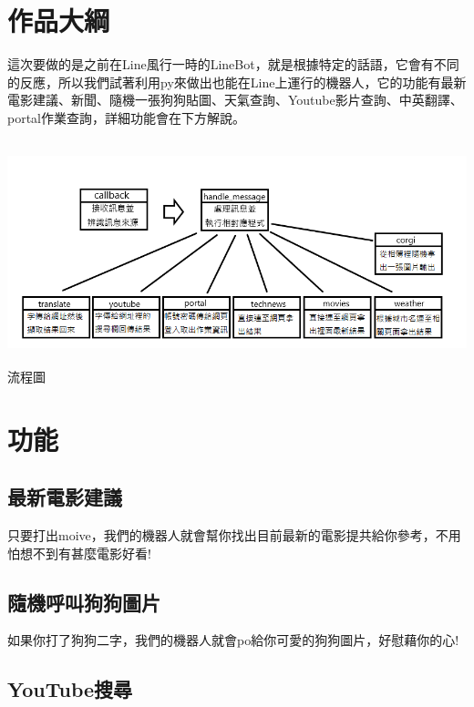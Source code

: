\documentclass{scrreprt}
\begin{document}
\begin{CJK}{UTF8}{bkai}
\chapter{作品大綱}

這次要做的是之前在Line風行一時的LineBot，就是根據特定的話語，它會有不同的反應，所以我們試著利用py來做出也能在Line上運行的機器人，它的功能有{\color{red}最新電影建議}、{\color{red}新聞}、{\color{red}隨機一張狗狗貼圖}、{\color{red}天氣查詢}、{\color{red}Youtube影片查詢}、{\color{red}中英翻譯}、{\color{red}portal作業查詢}，詳細功能會在下方解說。

\begin{center}
\includegraphics[width=15cm,height=6.5cm]{flow.png}
\\流程圖
\end{center}

\chapter{功能}

\section{最新電影建議}

只要打出{\color{red}moive}，我們的機器人就會幫你找出目前最新的電影提共給你參考，不用怕想不到有甚麼電影好看!

\section{隨機呼叫狗狗圖片}

如果你打了{\color{red}狗狗}二字，我們的機器人就會po給你可愛的狗狗圖片，好慰藉你的心!

\section{YouTube搜尋}


\end{CJK}
\end{document}

